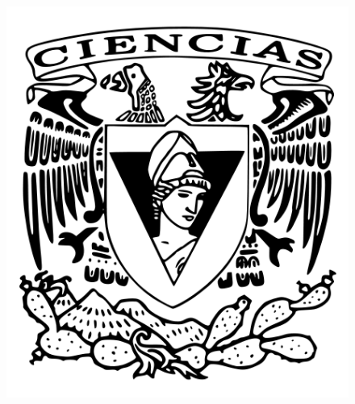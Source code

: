 \begin{center}
    \begin{figure}[b]
        \raggedleft
        \includegraphics[scale=0.165]{Facultad de Ciencias.png}
    \end{figure}
\end{center}
